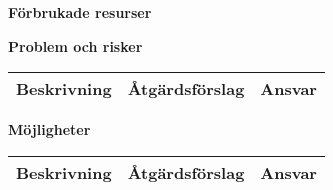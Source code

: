 \documentclass[titlepage, a4paper]{article}
\begin{document}
\vspace{7mm}

\newpage
\textbf{\Large Förbrukade resurser}


\vspace{7mm}
\textbf{\Large Problem och risker}

\begin{center}
\begin{tabularx}{\textwidth}{| X | X | p{13.5mm} |}
	\hline
	\textbf{Beskrivning} & \textbf{Åtgärdsförslag} & \textbf{Ansvar} \\\hline	
\end{tabularx}
\end{center}

\vspace{7mm}
\textbf{\Large Möjligheter}
\begin{center}
\begin{tabularx}{\textwidth}{| X | X | p{13.5mm} |}
	\hline
	\textbf{Beskrivning} & \textbf{Åtgärdsförslag} & \textbf{Ansvar} \\\hline	
\end{tabularx}
\end{center}
\end{document}
